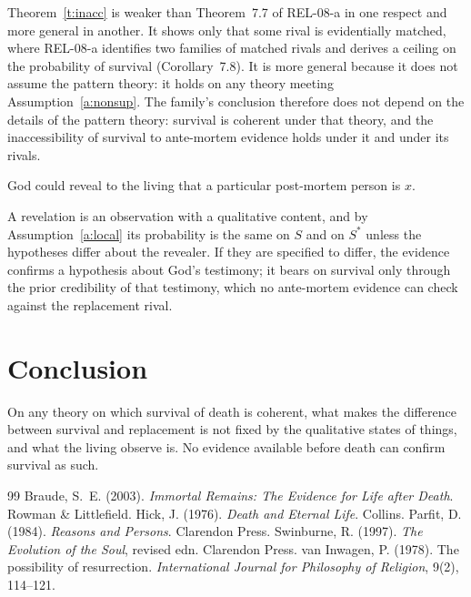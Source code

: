 \documentclass{situationist-preprint}
\begin{document}
Theorem~\ref{t:inacc} is weaker than Theorem~7.7 of REL-08-a in one respect and more general in another. It shows only that some rival is evidentially matched, where REL-08-a identifies two families of matched rivals and derives a ceiling on the probability of survival (Corollary~7.8). It is more general because it does not assume the pattern theory: it holds on any theory meeting Assumption~\ref{a:nonsup}. The family's conclusion therefore does not depend on the details of the pattern theory: survival is coherent under that theory, and the inaccessibility of survival to ante-mortem evidence holds under it and under its rivals.

\begin{objection}
God could reveal to the living that a particular post-mortem person is $x$.
\end{objection}

\begin{reply}
A revelation is an observation with a qualitative content, and by Assumption~\ref{a:local} its probability is the same on $S$ and on $S^{*}$ unless the hypotheses differ about the revealer. If they are specified to differ, the evidence confirms a hypothesis about God's testimony; it bears on survival only through the prior credibility of that testimony, which no ante-mortem evidence can check against the replacement rival.
\end{reply}

\section{Conclusion}

On any theory on which survival of death is coherent, what makes the difference between survival and replacement is not fixed by the qualitative states of things, and what the living observe is. No evidence available before death can confirm survival as such.

\begin{thebibliography}{99}\small
{} Braude, S.~E. (2003). \emph{Immortal Remains: The Evidence for Life after Death}. Rowman \& Littlefield.
 Hick, J. (1976). \emph{Death and Eternal Life}. Collins.
 Parfit, D. (1984). \emph{Reasons and Persons}. Clarendon Press.
 Swinburne, R. (1997). \emph{The Evolution of the Soul}, revised edn. Clarendon Press.
 van Inwagen, P. (1978). The possibility of resurrection. \emph{International Journal for Philosophy of Religion}, 9(2), 114--121.
\end{thebibliography}
\end{document}
